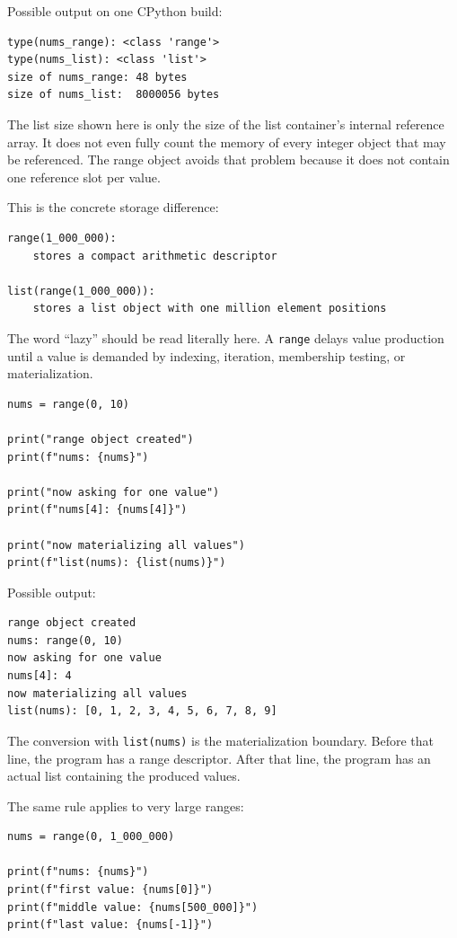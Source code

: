 Possible output on one CPython build:

\begin{verbatim}
type(nums_range): <class 'range'>
type(nums_list): <class 'list'>
size of nums_range: 48 bytes
size of nums_list:  8000056 bytes
\end{verbatim}

The list size shown here is only the size of the list container's internal reference array. It does not even fully count the memory of every integer object that may be referenced. The range object avoids that problem because it does not contain one reference slot per value.

This is the concrete storage difference:

\begin{verbatim}
range(1_000_000):
    stores a compact arithmetic descriptor

list(range(1_000_000)):
    stores a list object with one million element positions
\end{verbatim}

The word \enquote{lazy} should be read literally here. A \texttt{range} delays value production until a value is demanded by indexing, iteration, membership testing, or materialization.

\begin{verbatim}
nums = range(0, 10)

print("range object created")
print(f"nums: {nums}")

print("now asking for one value")
print(f"nums[4]: {nums[4]}")

print("now materializing all values")
print(f"list(nums): {list(nums)}")
\end{verbatim}

Possible output:

\begin{verbatim}
range object created
nums: range(0, 10)
now asking for one value
nums[4]: 4
now materializing all values
list(nums): [0, 1, 2, 3, 4, 5, 6, 7, 8, 9]
\end{verbatim}

The conversion with \texttt{list(nums)} is the materialization boundary. Before that line, the program has a range descriptor. After that line, the program has an actual list containing the produced values.

The same rule applies to very large ranges:

\begin{verbatim}
nums = range(0, 1_000_000)

print(f"nums: {nums}")
print(f"first value: {nums[0]}")
print(f"middle value: {nums[500_000]}")
print(f"last value: {nums[-1]}")
\end{verbatim}

